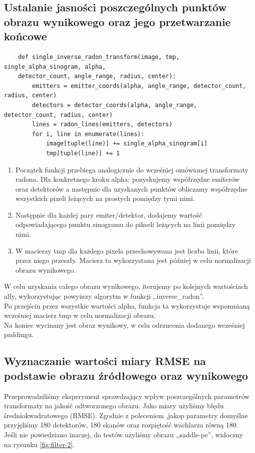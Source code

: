 \documentclass[11pt]{article}
\begin{document}
\subsection{Ustalanie jasności poszczególnych punktów obrazu wynikowego oraz jego przetwarzanie końcowe}
\begin{verbatim}
    def single_inverse_radon_transform(image, tmp, single_alpha_sinogram, alpha,
    detector_count, angle_range, radius, center):
        emitters = emitter_coords(alpha, angle_range, detector_count, radius, center)
        detectors = detector_coords(alpha, angle_range, detector_count, radius, center)
        lines = radon_lines(emitters, detectors)
        for i, line in enumerate(lines):
            image[tuple(line)] += single_alpha_sinogram[i]
            tmp[tuple(line)] += 1
\end{verbatim}
\begin{enumerate}
\item Początek funkcji przebiega analogicznie do wcześniej omówionej transformaty radona. Dla konkretnego kroku alpha: pozyskujemy współrzędne emiterów oraz detektorów a następnie dla uzyskanych punktów obliczamy współrzędne wszystkich pixeli leżących na prostych pomiędzy tymi nimi.
\item Następnie dla każdej pary emiter/detektor, dodajemy wartość odpowiadającego punktu sinogramu do pikseli leżących na linii pomiędzy nimi.
\item W macierzy tmp dla każdego pixela przechowywana jest liczba linii, które przez niego przeszły. Macierz ta wykorzystana jest później w celu normalizacji obrazu wynikowego.
\end{enumerate}
W celu uzyskania całego obrazu wynikowego, iterujemy po kolejnych wartościach alfy, wykorzystując powyższy algorytm w funkcji ,,inverse\_radon''. \\
Po przejściu przez wszystkie wartości alpha, funkcja ta wykorzystuje wspomnianą wcześniej macierz tmp w celu normalizacji obrazu. \\
Na koniec wycinany jest obraz wynikowy, w celu odrzucenia dodanego wcześniej paddingu.






\subsection{Wyznaczanie wartości miary RMSE na podstawie obrazu źródłowego oraz wynikowego}

Przeprowadziliśmy eksperyment sprawdzający wpływ poszczególnych parametrów transformaty na jakość odtworzonego obrazu. Jako miary użyliśmy błędu średniokwadratowego (RMSE). Zgodnie z poleceniem ,jakop parametry domyślne przyjęliśmy 180 detektorów, 180 skanów oraz rozpiętość wachlarza równą 180. Jeśli nie powiedziano inaczej, do testów użyliśmy obrazu ,,saddle-pe'', widoczny na rysunku \ref{fig:filter-2}.
\end{document}
